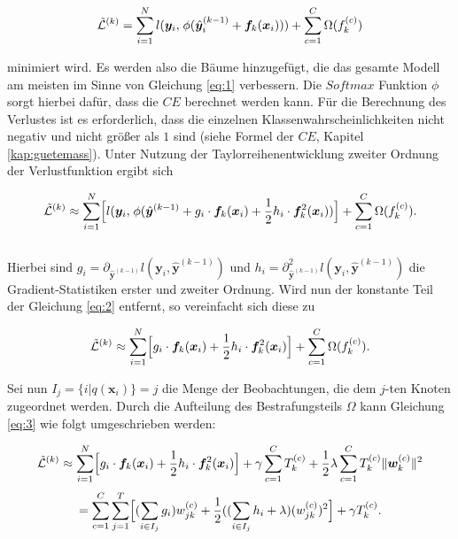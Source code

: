\documentclass[a4paper,11pt]{article}
\begin{document}
\[\Tilde{\mathcal{L}}^{(k)} = \sum_{i = 1}^N l(\bm{y}_i,\hspace{0.04cm} \phi (\hat{\bm{y}}_i^{(k-1)} + \bm{f}_k(\bm{x}_i))) + \sum_{c=1}^C \Omega(f_k^{(c)}) \]

minimiert wird. Es werden also die Bäume hinzugefügt, die das gesamte Modell am meisten im Sinne von Gleichung \ref{eq:1} verbessern. Die $Softmax$ Funktion $\phi$ sorgt hierbei dafür, dass die $CE$ berechnet werden kann. Für die Berechnung des Verlustes ist es erforderlich, dass die einzelnen Klassenwahrscheinlichkeiten nicht negativ und nicht größer als $1$ sind (siehe Formel der $CE$, Kapitel \ref{kap:guetemass}). Unter Nutzung der Taylorreihenentwicklung zweiter Ordnung der Verlustfunktion ergibt sich 

\begin{equation}\label{eq:2}
     \Tilde{\mathcal{L}}^{(k)} \approx \sum_{i = 1}^N \Bigl[ l(\bm{y}_i,\hspace{0.04cm} \phi(\hat{\bm{y}}^{(k-1)} + g_i \cdot \bm{f}_k(\bm{x}_i) + \frac{1}{2}h_i \cdot \bm{f}_k^2(\bm{x}_i)) \Bigr] + \sum_{c=1}^C \Omega(f_k^{(c)}). 
\end{equation}{}\\

Hierbei sind $g_i = \partial_{\hat{\bm{y}}^{(k-1)}} l(\bm{y}_i, \hat{\bm{y}}^{(k-1)})$  und $h_i = \partial_{\hat{\bm{y}}^{(k-1)}}^2 l(\bm{y}_i, \hat{\bm{y}}^{(k-1)})$ die Gradient-Statistiken erster und zweiter Ordnung. Wird nun der konstante Teil der Gleichung \ref{eq:2} entfernt, so vereinfacht sich diese zu

\begin{equation}\label{eq:3}
     \Tilde{\mathcal{L}}^{(k)} \approx \sum_{i = 1}^N \Bigl[g_i \cdot \bm{f}_k(\bm{x}_i) + \frac{1}{2}h_i \cdot \bm{f}_k^2(\bm{x}_i) \Bigr] + \sum_{c=1}^C \Omega(f_k^{(c)}). 
\end{equation}{}

Sei nun $I_j = \{i|q(\bm{x}_i)\} = j$ die Menge der Beobachtungen, die dem $j$-ten Knoten zugeordnet werden. Durch die Aufteilung des Bestrafungsteils $\Omega$ kann Gleichung \ref{eq:3} wie folgt umgeschrieben werden:

\begin{equation}\label{eq:4}
     \Tilde{\mathcal{L}}^{(k)} \approx \sum_{i = 1}^N \Bigl[g_i \cdot \bm{f}_k(\bm{x}_i) + \frac{1}{2}h_i \cdot \bm{f}_k^2(\bm{x}_i) \Bigr] + \gamma \sum_{c=1}^C T_k^{(c)} + \frac{1}{2} \lambda \sum_{c=1}^C T_k^{(c)} \|\bm{w}_k^{(c)}\|^2 
\end{equation}{}
\begin{equation*}
     =\sum_{c=1}^C  \sum_{j = 1}^T \Bigl[(\sum_{i \in I_j}g_i) w_{jk}^{(c)} + \frac{1}{2}((\sum_{i \in I_j} h_i + \lambda) (w_{jk}^{(c)})^2 \Bigr] + \gamma T_k^{(c)}.
\end{equation*}{}
\end{document}

